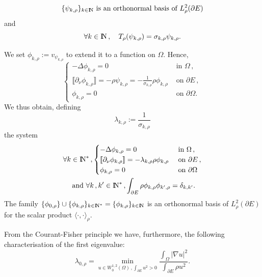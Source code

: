 \documentclass{article}
\newcommand{\N}{\textnormal{I\kern-0.21emN}}
\def\O{{\Omega}}
\def\n{{\nabla}}
\numberwithin{equation}{section}
\begin{document}
$$\{\psi_{k,\rho}\}_{k\in \N}\text{ is an orthonormal basis of $L^2_\rho(\partial E)$}$$ and 
$$\forall k\in \N\,, \quad T_\rho(\psi_{k,\rho})=\sigma_{k,\rho}\psi_{k,\rho}.$$

We set $\phi_{k,\rho}:=v_{\psi_{k,\rho}}$ to extend it to a function on $\O$. Hence,
\begin{equation}\label{Eq:eigen}
\begin{cases}
-\Delta \phi_{k,\rho}=0&	\text{ in }\O\,, 
\\ \llbracket\partial_\nu \phi_{k,\rho}\rrbracket=-\rho \psi_{k,\rho}=-\frac1{\sigma_{k,\rho}}\rho \phi_{k,\rho}&\text{  on }\partial E\,, 
\\  \phi_{k,\rho}=0&\text{ on }\partial\O.\end{cases}\end{equation} We thus obtain, defining 
$$\lambda_{k,\rho}:=\frac1{\sigma_{k,\rho}}$$ the system
\begin{multline}\label{Eq:eigen2}
\forall k\in \N^*\,, \begin{cases}
-\Delta \phi_{k,\rho}=0&	\text{ in }\O\,, 
\\ \llbracket\partial_\nu \phi_{k,\rho}\rrbracket=-\lambda_{k,\rho}\rho \phi_{k,\rho}&\text{  on }\partial E\,, 
\\ \phi_{k,\rho}=0&\text{ on }\partial \O\end{cases} \\\text{ and } \forall k\,, k'\in \N^*\,, \int_{\partial E}\rho \phi_{k,\rho}\phi_{k',\rho}=\delta_{k,k'}.\end{multline} The family $\{\phi_{0,\rho}\}\cup \{\phi_{k,\rho}\}_{k\in \N^*}=\{\phi_{k,\rho}\}_{k\in \N}$ is an orthonormal basis of $L^2_\rho(\partial E)$ for the scalar product $ \langle \cdot,\cdot \rangle_\rho$.

From the Courant-Fisher principle we have, furthermore, the following characterisation of the first eigenvalue:
\begin{equation}\label{Eq:RayleighRho}
\lambda_{0,\rho}=\min_{u\in W^{1,2}_0(\O)\,, \int_{\partial E}u^2>0}\frac{\int_\O|\n u|^2}{\int_{\partial E}\rho u^2}.
\end{equation}
\end{document}
